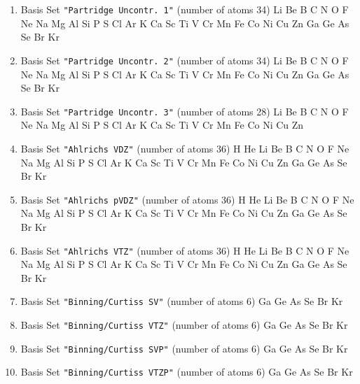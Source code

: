 \begin{enumerate}
\item Basis Set \verb#"Partridge Uncontr. 1"# (number of atoms 34)  \newline 
  Li Be B C N O F Ne Na Mg Al Si P S Cl Ar K Ca Sc Ti V Cr Mn Fe Co
 Ni Cu Zn Ga Ge As Se Br Kr


\item Basis Set \verb#"Partridge Uncontr. 2"# (number of atoms 34)  \newline 
  Li Be B C N O F Ne Na Mg Al Si P S Cl Ar K Ca Sc Ti V Cr Mn Fe Co
 Ni Cu Zn Ga Ge As Se Br Kr


\item Basis Set \verb#"Partridge Uncontr. 3"# (number of atoms 28)  \newline 
  Li Be B C N O F Ne Na Mg Al Si P S Cl Ar K Ca Sc Ti V Cr Mn Fe Co
 Ni Cu Zn


\item Basis Set \verb#"Ahlrichs VDZ"# (number of atoms 36)  \newline 
  H He Li Be B C N O F Ne Na Mg Al Si P S Cl Ar K Ca Sc Ti V Cr Mn
 Fe Co Ni Cu Zn Ga Ge As Se Br Kr


\item Basis Set \verb#"Ahlrichs pVDZ"# (number of atoms 36)  \newline 
  H He Li Be B C N O F Ne Na Mg Al Si P S Cl Ar K Ca Sc Ti V Cr Mn
 Fe Co Ni Cu Zn Ga Ge As Se Br Kr


\item Basis Set \verb#"Ahlrichs VTZ"# (number of atoms 36)  \newline 
  H He Li Be B C N O F Ne Na Mg Al Si P S Cl Ar K Ca Sc Ti V Cr Mn
 Fe Co Ni Cu Zn Ga Ge As Se Br Kr


\item Basis Set \verb#"Binning/Curtiss SV"# (number of atoms 6)  \newline 
  Ga Ge As Se Br Kr


\item Basis Set \verb#"Binning/Curtiss VTZ"# (number of atoms 6)  \newline 
  Ga Ge As Se Br Kr


\item Basis Set \verb#"Binning/Curtiss SVP"# (number of atoms 6)  \newline 
  Ga Ge As Se Br Kr


\item Basis Set \verb#"Binning/Curtiss VTZP"# (number of atoms 6)  \newline 
  Ga Ge As Se Br Kr



\end{enumerate}
